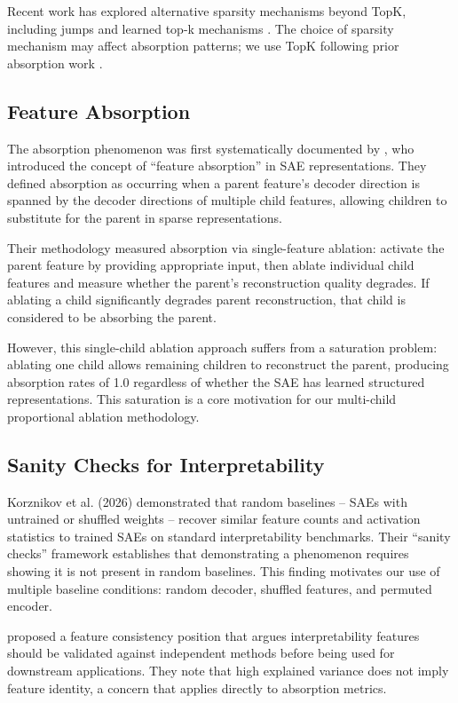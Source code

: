 \documentclass{article}
\begin{document}
Recent work has explored alternative sparsity mechanisms beyond TopK, including jumps \citep{sharkey2024} and learned top-k mechanisms \citep{gao2025}. The choice of sparsity mechanism may affect absorption patterns; we use TopK following prior absorption work \citep{chanin2024}.

\subsection{Feature Absorption}

The absorption phenomenon was first systematically documented by \citet{chanin2024}, who introduced the concept of ``feature absorption'' in SAE representations. They defined absorption as occurring when a parent feature's decoder direction is spanned by the decoder directions of multiple child features, allowing children to substitute for the parent in sparse representations.

Their methodology measured absorption via single-feature ablation: activate the parent feature by providing appropriate input, then ablate individual child features and measure whether the parent's reconstruction quality degrades. If ablating a child significantly degrades parent reconstruction, that child is considered to be absorbing the parent.

However, this single-child ablation approach suffers from a saturation problem: ablating one child allows remaining children to reconstruct the parent, producing absorption rates of 1.0 regardless of whether the SAE has learned structured representations. This saturation is a core motivation for our multi-child proportional ablation methodology.

\subsection{Sanity Checks for Interpretability}

Korznikov et al. (2026) demonstrated that random baselines -- SAEs with untrained or shuffled weights -- recover similar feature counts and activation statistics to trained SAEs on standard interpretability benchmarks. Their ``sanity checks'' framework establishes that demonstrating a phenomenon requires showing it is not present in random baselines. This finding motivates our use of multiple baseline conditions: random decoder, shuffled features, and permuted encoder.

\citet{song2025} proposed a feature consistency position that argues interpretability features should be validated against independent methods before being used for downstream applications. They note that high explained variance does not imply feature identity, a concern that applies directly to absorption metrics.
\end{document}
